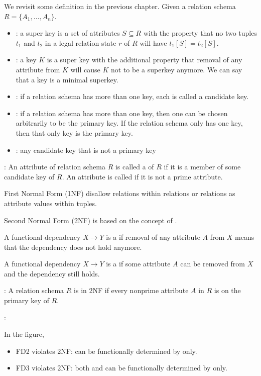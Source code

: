     \par We revisit some definition in the previous chapter. Given a relation schema $R = \{A_1, \ldots, A_n\}$.
    \begin{itemize}
      \item {}: a super key is a set of attributes $S \subseteq R$ with the property that no two tuples $t_1$ and $t_2$ in a legal relation state $r$ of $R$ will have $t_1[S] = t_2[S]$.
      \item {}: a key $K$ is a super key with the additional property that removal of any attribute from $K$ will cause $K$ not to be a superkey anymore. We can say that a key is a minimal superkey.
      \item {}: if a relation schema has more than one key, each is called a candidate key.
      \item {}: if a relation schema has more than one key, then one can be chosen arbitrarily to be the primary key. If the relation schema only has one key, then that only key is the primary key.
      \item {}: any candidate key that is not a primary key
    \end{itemize}
  \par {}: An attribute of relation schema $R$ is called a  of $R$ if it is a member of some candidate key of $R$. An attribute is called  if it is not a prime attribute.

    \par First Normal Form (1NF) disallow relations within relations or relations as attribute values within tuples. 

    \par Second Normal Form (2NF) is based on the concept of .
    \par A functional dependency $X \to Y$ is a  if removal of any attribute $A$ from $X$ means that the dependency does not hold anymore.
    \par A functional dependency $X \to Y$ is a  if some attribute $A$ can be removed from $X$ and the dependency still holds.
    \par {}: A relation schema $R$ is in 2NF if every nonprime attribute $A$ in $R$ is  on the primary key of $R$.
    \par {}:
    \par In the figure,
      \begin{itemize}
        \item FD2 violates 2NF:  can be functionally determined by  only.
        \item FD3 violates 2NF: both  and  can be functionally determined by  only.
      \end{itemize}

